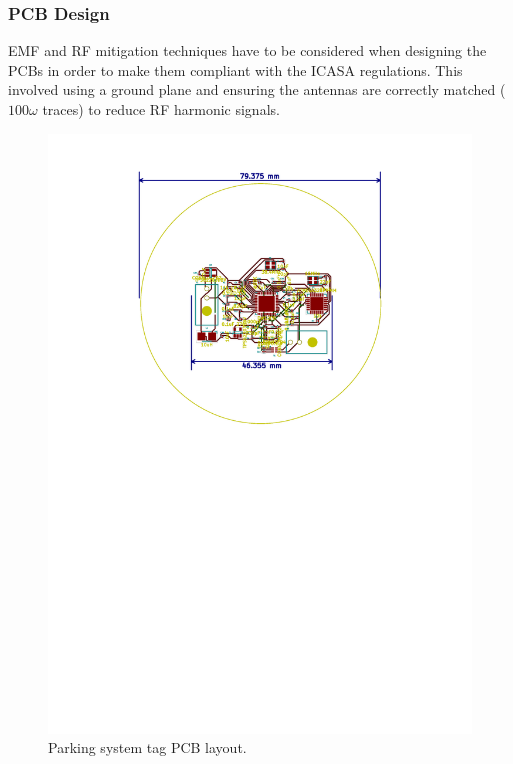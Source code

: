 \newpage
\subsubsection{PCB Design}

EMF and RF mitigation techniques have to be considered when designing the PCBs in order to make them compliant with the ICASA regulations. This involved using a ground plane and ensuring the antennas are correctly matched ($100\omega$ traces) to reduce RF harmonic signals.

\begin{figure}[H]
\begin{center}
\includegraphics[scale=0.7,trim={4cm 15cm 4cm 1cm},clip]{data/pcb-layout.pdf}
\caption{Parking system tag PCB layout.}
\end{center}
\end{figure}

